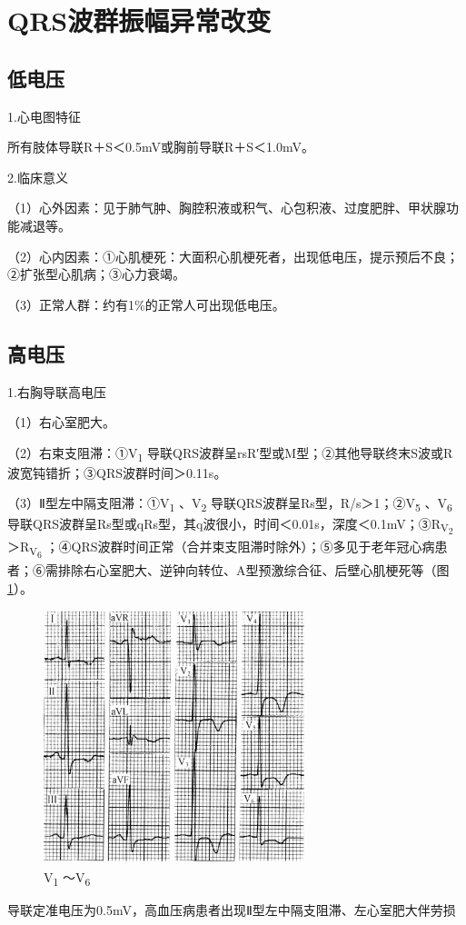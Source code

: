 \section{QRS波群振幅异常改变}

\protect\hypertarget{text00009.htmlux5cux23subid39}{}{}

\subsection{低电压}

1.心电图特征

所有肢体导联R＋S＜0.5mV或胸前导联R＋S＜1.0mV。

2.临床意义

（1）心外因素：见于肺气肿、胸腔积液或积气、心包积液、过度肥胖、甲状腺功能减退等。

（2）心内因素：①心肌梗死：大面积心肌梗死者，出现低电压，提示预后不良；②扩张型心肌病；③心力衰竭。

（3）正常人群：约有1\%的正常人可出现低电压。

\protect\hypertarget{text00009.htmlux5cux23subid40}{}{}

\subsection{高电压}

1.右胸导联高电压

（1）右心室肥大。

（2）右束支阻滞：①V\textsubscript{1}
导联QRS波群呈rsR′型或M型；②其他导联终末S波或R波宽钝错折；③QRS波群时间＞0.11s。

（3）Ⅱ型左中隔支阻滞：①V\textsubscript{1} 、V\textsubscript{2}
导联QRS波群呈Rs型，R/s＞1；②V\textsubscript{5} 、V\textsubscript{6}
导联QRS波群呈Rs型或qRs型，其q波很小，时间＜0.01s，深度＜0.1mV；③R\textsubscript{V\textsubscript{2}}
＞R\textsubscript{V\textsubscript{6}}
；④QRS波群时间正常（合并束支阻滞时除外）；⑤多见于老年冠心病患者；⑥需排除右心室肥大、逆钟向转位、A型预激综合征、后壁心肌梗死等（图\ref{fig3-1}）。

\begin{figure}[!htbp]
 \centering
 \includegraphics[width=2.98958in,height=2.91667in]{./images/Image00050.jpg}
 \captionsetup{justification=centering}
 \caption{V\textsubscript{1} ～V\textsubscript{6}}
 \label{fig3-1}
  \end{figure} 
导联定准电压为0.5mV，高血压病患者出现Ⅱ型左中隔支阻滞、左心室肥大伴劳损

